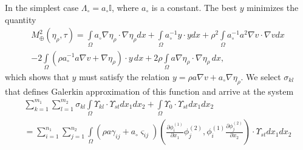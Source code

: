 \documentclass[amstex,amstext,amsfonts,epsf,12pt] {amsart}
\newcommand\be{\begin{eqnarray*}}
\newcommand\ee{\end{eqnarray*}}
\def\be{\begin{eqnarray*}}
\def\ee{\end{eqnarray*}}
\def\IntO{\int\limits_\Omega}
\def\phix{\phi^{(1)}}
\def\phiy{\phi^{(2)}}
\begin{document}
In the simplest case
$\Lambda_\circ=a_\circ{\mathbb I}$, where $a_\circ$ is a constant. The best $y$  minimizes the quantity
\begin{multline}
\label{4.10}
M^2_\oplus(\eta_\rho,\tau)=
 \IntO a_\circ \nabla \eta_\rho\cdot \nabla \eta_\rho dx+
 \IntO a^{-1}_\circ y\cdot y dx+\rho^2\IntO a^{-1}_\circ a^2
 \nabla v\cdot \nabla v dx\\
- 2\IntO (\rho a^{-1}_\circ a\nabla v+\nabla \eta_\rho)\cdot y\,dx+
 2\rho\IntO a\nabla \eta_\rho\cdot\nabla \eta_\rho\,dx,
 \end{multline}
 which shows that  $y$ must satisfy the relation $y=\rho a\nabla v+a_\circ\nabla\eta_\rho$.
 We select $\sigma_{kl}$ that defines Galerkin approximation of this function
  and arrive at the system
 \begin{multline}
 \label{4.11}
 \sum\limits^{m_1}_{k=1}
\sum\limits^{m_2}_{l=1}\sigma_{kl}\IntO \Upsilon_{kl}\cdot\Upsilon_{st}
dx_1dx_2+\IntO \Upsilon_0\cdot\Upsilon_{st} dx_1dx_2\\
=\sum\limits^{n_1}_{i=1}
\sum\limits^{n_2}_{j=1}
\IntO (\rho a \gamma_{ij}+a_\circ \varsigma_{ij})\left(\frac{\partial\phix_{i}}{\partial x_1}\phiy_{j},
 \phix_{i}\frac{\partial\phiy_{j}}{\partial x_2}\right)\cdot \Upsilon_{st}
dx_1dx_2
 \end{multline}
 
\end{document}
